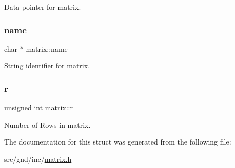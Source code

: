 Data pointer for matrix. 

\mbox{\label{structmatrix_a1c8243eae410f7cdd9b8a63d1389c771}} 
\subsubsection{\texorpdfstring{name}{name}}
{\footnotesize\ttfamily char $\ast$ matrix\+::name}



String identifier for matrix. 

\mbox{\label{structmatrix_ac5217ab574fd3214f35f417a947b4bb1}} 
\subsubsection{\texorpdfstring{r}{r}}
{\footnotesize\ttfamily unsigned int matrix\+::r}



Number of Rows in matrix. 



The documentation for this struct was generated from the following file\+:\begin{DoxyCompactItemize}
\item 
src/gnd/inc/\hyperlink{inc_2matrix_8h}{matrix.\+h}\end{DoxyCompactItemize}
